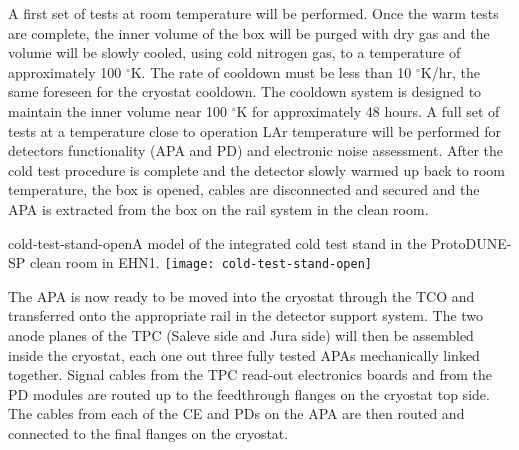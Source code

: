 A first set of tests at room temperature will be performed. Once the warm tests are complete, the inner volume of the box will be purged with dry gas and the volume will be slowly cooled, using cold nitrogen gas, to a temperature of approximately 100 $^\circ$K.  The rate of cooldown must be less than 10 $^\circ$K/hr, the same foreseen for the cryostat cooldown.  The cooldown system is designed to maintain the inner volume near 100 $^\circ$K for approximately 48 hours. A full set of tests at a temperature 
close to operation LAr temperature will be performed for detectors functionality (APA and PD) and electronic noise assessment.  
After the cold test procedure is complete and the detector slowly warmed up back to room temperature, the box is opened, cables are disconnected and secured and the APA is extracted from the box on the rail system in the clean room. 
\begin{cdrfigure}{cold-test-stand-open}{A model of the integrated cold test stand in the ProtoDUNE-SP clean room in EHN1.}
\texttt{[image: cold-test-stand-open]}
\end{cdrfigure}
The APA is now ready to be moved into the cryostat through the TCO and transferred onto the appropriate rail in the detector support system.  The two anode planes of the TPC (Saleve side and Jura side) will then be assembled inside the cryostat, each one out three fully tested APAs mechanically linked together. Signal cables from the TPC read-out electronics boards and from the PD modules 
are routed up to the feedthrough flanges on the cryostat top side.
The cables from each of the CE and PDs on the APA are then routed and connected to the final flanges on the cryostat. 



